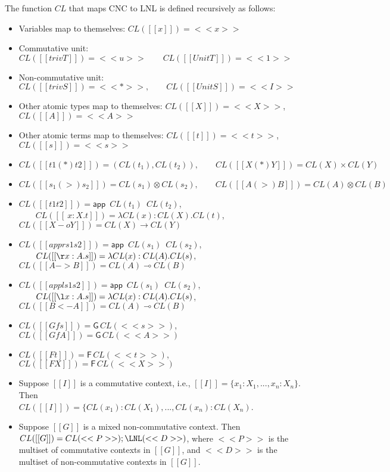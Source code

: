 \begin{definition}
  The function $CL$ that maps CNC to LNL is defined recursively as follows:
  \begin{itemize}
  \item Variables map to themselves: $CL([[x]]) = <<x>>$
  \item Commutative unit: $CL([[trivT]]) = <<u>> \qquad CL([[UnitT]]) = <<1>>$
  \item Non-commutative unit: $CL([[trivS]]) = <<*>>, \qquad CL([[UnitS]]) = <<I>>$
  \item Other atomic types map to themselves: $CL([[X]]) = <<X>>$,
        $CL([[A]]) = <<A>>$
  \item Other atomic terms map to themselves: $CL([[t]]) = <<t>>$,
        $CL([[s]]) = <<s>>$
  \item $CL([[t1 (*) t2]]) = (CL(t_1),CL(t_2)), \qquad CL([[X (*) Y]])=CL(X)\times CL(Y) $
  \item $CL([[s_1 (>) s_2]]) = CL(s_1)\otimes CL(s_2), \qquad CL([[A (>) B]])=CL(A)\otimes CL(B)$
  \item $CL([[t1 t2]]) = \mathsf{app}\,\,\,CL(t_1)\,\,\,CL(t_2)$,
        $\qquad CL([[\ x : X.t]]) = \lambda CL(x):CL(X).CL(t)$,\\
        $CL([[X -o Y]]) = CL(X) \rightarrow CL(Y)$
  \item $CL([[appr s1 s2]]) = \mathsf{app}\,\,\,CL(s_1)\,\,\,CL(s_2)$,
        $\qquad CL([[\r x : A.s]]) = \lambda CL(x):CL(A).CL(s)$,\\
        $CL([[A -> B]]) = CL(A) \multimap CL(B)$
  \item $CL([[appl s1 s2]]) = \mathsf{app}\,\,\,CL(s_1)\,\,\,CL(s_2)$,
        $\qquad CL([[\l x : A.s]]) = \lambda CL(x):CL(A).CL(s)$,\\
        $CL([[B <- A]]) = CL(A) \multimap CL(B)$
  \item $CL([[Gf s]]) = \mathsf{G}\,CL(<<s>>)$, \qquad $CL([[Gf A]]) = \mathsf{G}\,CL(<<A>>)$
  \item $CL([[F t]]) = \mathsf{F}\,CL(<<t>>)$, \qquad $CL([[F X]]) = \mathsf{F}\,CL(<<X>>)$
  \item Suppose $[[I]]$ is a commutative context, i.e.,
        $[[I]]=\{x_1:X_1,...,x_n:X_n\}$. Then \\
        $CL([[I]])=\{CL(x_1):CL(X_1),...,CL(x_n):CL(X_n)$.
  \item Suppose $[[G]]$ is a mixed non-commutative context. Then
        $CL([[G]])=CL(<<P>>);\LNL(<<D>>)$, where $<<P>>$ is the multiset of
        commutative contexts in $[[G]]$, and $<<D>>$ is the multiset of
        non-commutative contexts in $[[G]]$.
  \end{itemize}
\end{definition}

